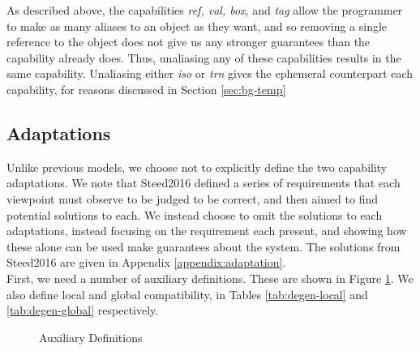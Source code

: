 As described above, the capabilities \textit{ref, val, box}, and \textit{tag} allow the programmer to make as many aliases to an object as they want, and so removing a single reference to the object does not give us any stronger guarantees than the capability already does. Thus, unaliasing any of these capabilities results in the same capability. Unaliasing either \textit{iso} or \textit{trn} gives the ephemeral counterpart each capability, for reasons discussed in Section \ref{sec:bg-temp}

\subsection{Adaptations}

Unlike previous models, we choose not to explicitly define the two capability adaptations. We note that Steed2016 defined a series of requirements that each viewpoint must observe to be judged to be correct, and then aimed to find potential solutions to each. We instead choose to omit the solutions to each adaptations, instead  focusing on the requirement each present, and showing how these alone can be used make guarantees about the system. The solutions from Steed2016 are given in Appendix \ref{appendix:adaptation}. \\

First, we need a number of auxiliary definitions. These are shown in Figure \ref{fig:degen-aux}. We also define local and global compatibility, in Tables \ref{tab:degen-local} and \ref{tab:degen-global} respectively.

\begin{figure}[H]
    \centering
    \caption{Auxiliary Definitions}
    \label{fig:degen-aux}
\end{figure}



